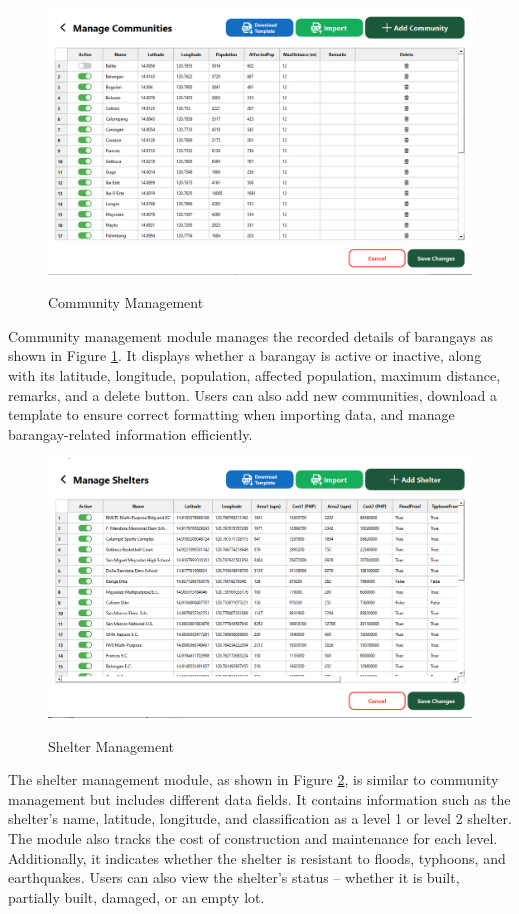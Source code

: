 	\begin{figure}[h!]
		\caption{Community Management}
		\centering
		\includegraphics[width=4.5in]{Chapter 4/commadvanced}
		\label{commMan}
	\end{figure}
	Community management module manages the recorded details of barangays as shown in Figure \ref{commMan}. It displays whether a barangay is active or inactive, along with its latitude, longitude, population, affected population, maximum distance, remarks, and a delete button. Users can also add new communities, download a template to ensure correct formatting when importing data, and manage barangay-related information efficiently.
	
	\begin{figure}[h!]
		\caption{Shelter Management}
		\centering
		\includegraphics[width=4.5in]{Chapter 4/sheladvanced}
		\label{shelMan}
	\end{figure}
	The shelter management module, as shown in Figure \ref{shelMan}, is similar to community management but includes different data fields. It contains information such as the shelter’s name, latitude, longitude, and classification as a level 1 or level 2 shelter. The module also tracks the cost of construction and maintenance for each level. Additionally, it indicates whether the shelter is resistant to floods, typhoons, and earthquakes. Users can also view the shelter’s status – whether it is built, partially built, damaged, or an empty lot.
	
